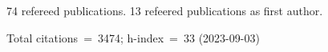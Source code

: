 74 refereed publications. 13 refeered publications as first author.

Total citations~=~3474; h-index~=~33 (2023-09-03)